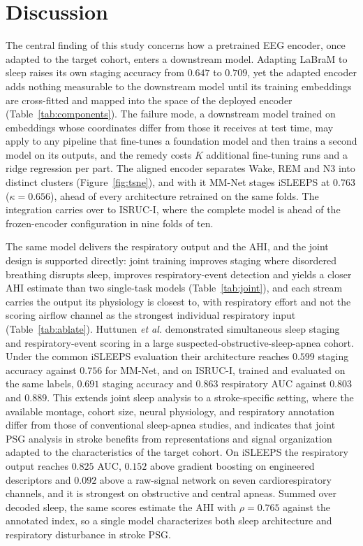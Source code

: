 \documentclass[a4paper,fleqn]{cas-sc}
\newcommand{\mmAcc}{0.763}
\newcommand{\mmAccS}{0.756}
\newcommand{\mmK}{0.656}
\newcommand{\mmAuc}{0.825}
\newcommand{\mmRho}{0.765}
\begin{document}
\section{Discussion}
\label{sec:discussion}

The central finding of this study concerns how a pretrained EEG encoder, once adapted to the
target cohort, enters a downstream model. Adapting LaBraM to sleep raises its own staging accuracy
from $0.647$ to $0.709$, yet the adapted encoder adds nothing measurable to the downstream model
until its training embeddings are cross-fitted and mapped into the space of the deployed encoder
(Table~\ref{tab:components}). The failure mode, a downstream model trained on embeddings whose
coordinates differ from those it receives at test time, may apply to any pipeline that fine-tunes
a foundation model and then trains a second model on its outputs, and the remedy costs $K$
additional fine-tuning runs and a ridge regression per part. The aligned encoder separates Wake,
REM and N3 into distinct clusters (Figure~\ref{fig:tsne}), and with it MM-Net stages iSLEEPS at
$\mmAcc$ ($\kappa=\mmK$), ahead of every architecture retrained on the same folds. The integration
carries over to ISRUC-I, where the complete model is ahead of the frozen-encoder configuration in
nine folds of ten.

The same model delivers the respiratory output and the AHI, and the joint design is supported
directly: joint training improves staging where disordered breathing disrupts sleep, improves
respiratory-event detection and yields a closer AHI estimate than two single-task models
(Table~\ref{tab:joint}), and each stream carries the output its physiology is closest to, with
respiratory effort and not the scoring airflow channel as the strongest individual respiratory
input (Table~\ref{tab:ablate}). Huttunen \emph{et al.}
\cite{huttunen2023simultaneous} demonstrated simultaneous sleep staging and respiratory-event
scoring in a large suspected-obstructive-sleep-apnea cohort. Under the common iSLEEPS evaluation
their architecture reaches $0.599$ staging accuracy against $\mmAccS$ for MM-Net, and on ISRUC-I,
trained and evaluated on the same labels, $0.691$ staging accuracy and $0.863$ respiratory AUC
against $0.803$ and $0.889$. This extends joint sleep analysis to a stroke-specific setting, where
the available montage, cohort size, neural physiology, and respiratory annotation differ from those
of conventional sleep-apnea studies, and indicates that joint PSG analysis in stroke benefits from
representations and signal organization adapted to the characteristics of the target cohort. On
iSLEEPS the respiratory output reaches $\mmAuc$ AUC, $0.152$ above
gradient boosting on engineered descriptors and $0.092$ above a raw-signal network on seven
cardiorespiratory channels, and it is strongest on obstructive and central apneas. Summed over decoded sleep,
the same scores estimate the AHI with $\rho=\mmRho$ against the annotated index, so a single model
characterizes both sleep architecture and respiratory disturbance in stroke PSG.
\end{document}
